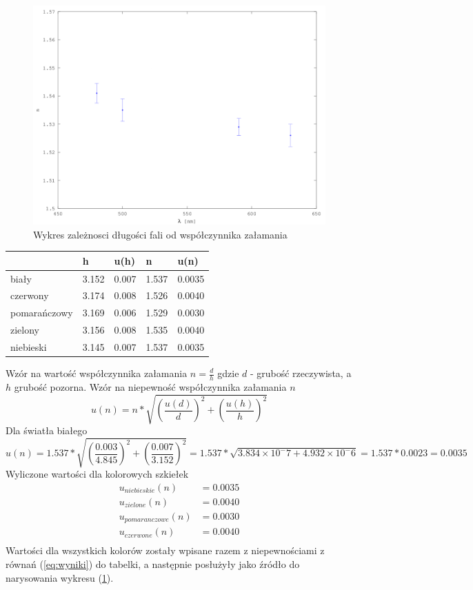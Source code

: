 \documentclass[a4paper,10pt,twoside]{article}
\begin{document}
\begin{figure}[!htp]
\centerline{\includegraphics[scale=0.5]{image-disperse}}
\caption{Wykres zależnosci długości fali od współczynnika załamania}
\label{fig:nlambda}
\end{figure}

\begin{table}[!htp]
\def\arraystretch{1.4}
\centering
\begin{tabular}{|l|l|l|l|l|}
\hline
             & h     & u(h)  & n     & u(n)   \\ \hline
biały        & 3.152 & 0.007 & 1.537 & 0.0035 \\ \hline
czerwony     & 3.174 & 0.008 & 1.526 & 0.0040 \\ \hline
pomarańczowy & 3.169 & 0.006 & 1.529 & 0.0030 \\ \hline
zielony      & 3.156 & 0.008 & 1.535 & 0.0040 \\ \hline
niebieski    & 3.145 & 0.007 & 1.537 & 0.0035 \\ \hline
\end{tabular}
\end{table}
\noindent
Wzór na wartość współczynnika załamania $n=\frac{d}{h}$ gdzie $d$ - grubość rzeczywista, a $h$ grubość pozorna.
\noindent
Wzór na niepewność współczynnika załamania $n$
$$u(n)=n*\sqrt{\left(\frac{u(d)}{d} \right )^2 + \left(\frac{u(h)}{h} \right )^2}$$
Dla światła białego
$$u(n)=1.537*\sqrt{\left (\frac{0.003}{4.845} \right )^2 + \left (\frac{0.007}{3.152} \right )^2}=1.537*\sqrt{3.834\times {10}^-7 + 4.932\times {10}^-6}=1.537*0.0023=0.0035$$
Wyliczone wartości dla kolorowych szkiełek
\begin{equation}
\label{eq:wyniki}
\begin{split}
u_{niebieskie}(n)&=0.0035 \\
u_{zielone}(n)&=0.0040 \\
u_{pomaranczowe}(n)&=0.0030 \\
u_{czerwone}(n)&=0.0040 \\
\end{split}
\end{equation}
Wartości dla wszystkich kolorów zostały wpisane razem z niepewnościami z równań (\ref{eq:wyniki}) do tabelki,
a następnie posłużyły jako źródło do narysowania wykresu (\ref{fig:nlambda}).
\end{document}
